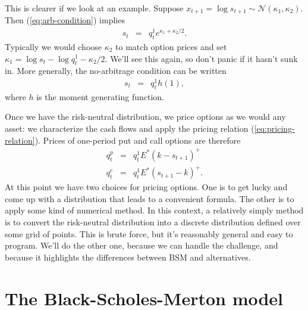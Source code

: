 \documentclass[11pt]{article}
\begin{document}
This is clearer if we look at an example.
Suppose $x_{t+1} = \log s_{t+1} \sim \mathcal{N} (\kappa_1,\kappa_2)$.
Then (\ref{eq:arb-condition}) implies
\begin{eqnarray}
    s_t &=& q^1_t e^{\kappa_1 + \kappa_2/2}.
    \label{eq:bsm-no-arb}
\end{eqnarray}
Typically we would choose $\kappa_2$ to match option prices
and set $\kappa_1 = \log s_t -\log q_t^1 - \kappa_2/2$.
We'll see this again, so don't panic if it hasn't sunk in.
More generally, the no-arbitrage condition can be written
\begin{eqnarray*}
    s_t &=& q^1_t h(1) , %
\end{eqnarray*}
where $h$ is the moment generating function.

Once we have the risk-neutral distribution,
we price options as we would any asset:
we characterize the cash flows and apply the pricing relation
(\ref{eq:pricing-relation}).
Prices of one-period put and call options are therefore
\begin{eqnarray*}
        q^p_t &=&  q_t^1 E^* (k-s_{t+1})^+  \\
        q^c_t &=&  q_t^1 E^* (s_{t+1}-k)^+ .
\end{eqnarray*}
At this point we have two choices for pricing options.
One is to get lucky and come up with a distribution that leads to a convenient formula.
The other is to apply some kind of numerical method.
In this context, a relatively simply method is to convert the
risk-neutral distribution into a discrete distribution defined
over some grid of points.
This is brute force, but it's reasonably general and easy to program.
We'll do the other one, because we can handle the challenge,
and because it highlights the differences
between BSM and alternatives.


\section{The Black-Scholes-Merton model}
\end{document}

